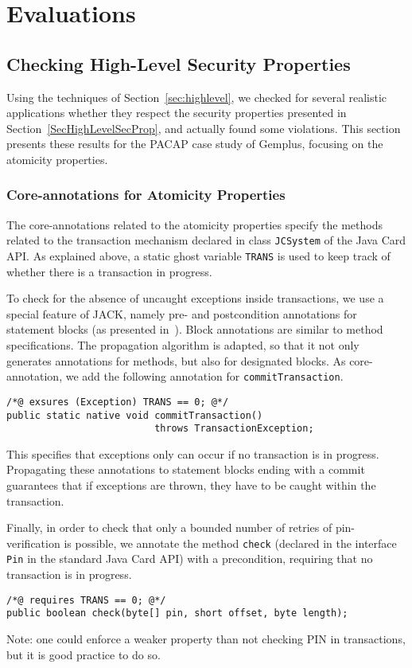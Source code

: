 \section{Evaluations}
\subsection{Checking High-Level Security Properties}\label{SecResults} 

Using the techniques of Section~\ref{sec:highlevel}, we checked for
several realistic applications whether they respect the security
properties presented in Section~\ref{SecHighLevelSecProp}, and
actually found some violations.  This section presents these results
for the PACAP case study of Gemplus, focusing on the atomicity properties.


\subsubsection{Core-annotations for Atomicity Properties}

The core-annotations related to the atomicity properties specify the
methods related to the transaction mechanism declared in class
\texttt{JCSystem} of the Java Card API. As explained above, a static
ghost variable \texttt{TRANS} is used to keep track of whether there
is a transaction in progress.  


To check for the absence of uncaught exceptions inside transactions,
we use a special feature of JACK, namely pre- and postcondition
annotations for statement blocks (as presented
in~\cite{BRL-JACK}). Block annotations are  similar to method
specifications. The propagation algorithm is adapted, so that it not
only generates annotations for methods, but also for designated
blocks. As core-annotation, we add the following annotation for
\texttt{commitTransaction}. 
\begin{verbatim}
/*@ exsures (Exception) TRANS == 0; @*/
public static native void commitTransaction() 
                          throws TransactionException;
\end{verbatim}
This specifies that exceptions only can occur if no transaction is in
progress. Propagating these annotations to statement blocks ending
with a commit guarantees that if exceptions are thrown, they have to
be caught within the transaction.

Finally, in order to check that only a bounded number of retries of
pin-verification is possible, we annotate the method \texttt{check}
(declared in the interface \texttt{Pin} in the
standard Java Card API) with a precondition, requiring that no
transaction is in progress.
\begin{verbatim}
/*@ requires TRANS == 0; @*/
public boolean check(byte[] pin, short offset, byte length);
\end{verbatim}
Note: one could enforce a weaker property than not checking
PIN in transactions, but it is good practice to do so.

